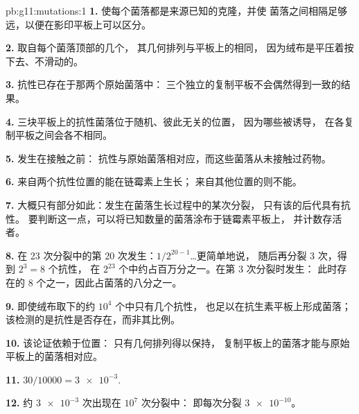 \begin{solution}{pb:g11:mutations:1}
\textbf{1.} 使每个菌落都是来源已知的克隆，并使
菌落之间相隔足够远，以便在影印平板上可以区分。

\textbf{2.} 取自每个菌落顶部的几个，
其几何排列与平板上的相同，
因为绒布是平压着按下去、不滑动的。

\textbf{3.} 抗性已存在于那两个原始菌落中：
三个独立的复制平板不会偶然得到一致的结果。

\textbf{4.} 三块平板上的抗性菌落位于随机、彼此无关的位置，
因为哪些被诱导，
在各复制平板之间会各不相同。

\textbf{5.} 发生在接触之前：
抗性与原始菌落相对应，而这些菌落从未接触过药物。

\textbf{6.} 来自两个抗性位置的能在链霉素上生长；
来自其他位置的则不能。

\textbf{7.} 大概只有部分如此：发生在菌落生长过程中的某次分裂，
只有该的后代具有抗性。
要判断这一点，可以将已知数量的菌落涂布于链霉素平板上，
并计数存活者。

\textbf{8.} 在 23 次分裂中的第 20 次发生：$1/2^{20-1}$\dots 更简单地说，
随后再分裂 3 次，得到 $2^3 = 8$ 个抗性，
在 $2^{23}$ 个中约占百万分之一。在第 3 次分裂时发生：
此时存在的 8 个之一，因此占菌落的八分之一。

\textbf{9.} 即使绒布取下的约 $10^4$ 个中只有几个抗性，
也足以在抗生素平板上形成菌落；
该检测的是抗性是否存在，而非其比例。

\textbf{10.} 该论证依赖于位置：
只有几何排列得以保持，
复制平板上的菌落才能与原始平板上的菌落相对应。

\textbf{11.} $30/\num{10000} = \num{3e-3}$.

\textbf{12.} 约 $\num{3e-3}$ 次出现在 $10^7$ 次分裂中：
即每次分裂 $\num{3e-10}$。


\end{solution}
